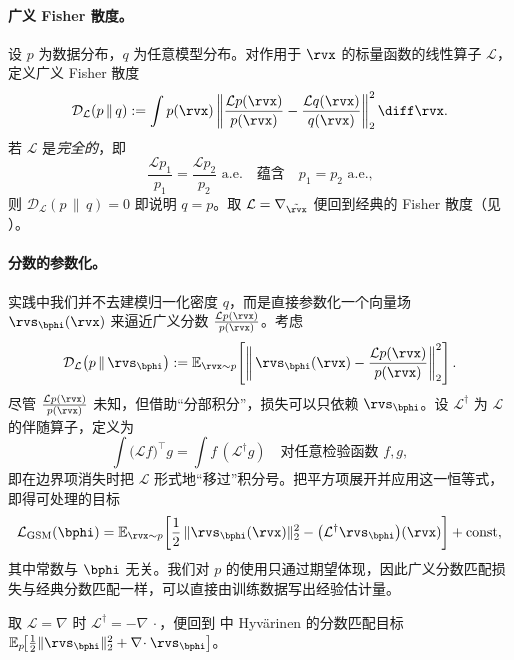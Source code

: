\paragraph{广义 Fisher 散度。}
设 $p$ 为数据分布，$q$ 为任意模型分布。对作用于 $\rvx$ 的标量函数的线性算子 $\mathcal L$，定义广义 Fisher 散度
\[
\mathcal D_{\mathcal L}(p \,\|\, q)
:= \int p(\rvx)
\left\|
\frac{\mathcal L p(\rvx)}{p(\rvx)}
-
\frac{\mathcal L q(\rvx)}{q(\rvx)}
\right\|_2^2 \diff \rvx.
\]
若 $\mathcal L$ 是\emph{完全的}，即
\[
\frac{\mathcal L p_1}{p_1}=\frac{\mathcal L p_2}{p_2} \text{ a.e.}\quad \text{蕴含}\quad p_1=p_2 \text{ a.e.,}
\]
则 $\mathcal D_{\mathcal L}(p \,\|\, q)=0$ 即说明 $q=p$。取 $\mathcal L=\nabla_{\tilde\rvx}$ 便回到经典的 Fisher 散度（见 ）。

\paragraph{分数的参数化。}
实践中我们并不去建模归一化密度 $q$，而是直接参数化一个向量场 $\rvs_\bphi(\rvx)$ 来逼近广义分数 $\frac{\mathcal L p(\rvx)}{p(\rvx)}$。考虑
\[
\mathcal D_{\mathcal L}\!\left(p \,\|\, \rvs_\bphi\right)
:= \mathbb E_{\rvx\sim p}\!\left[\left\|\,\rvs_\bphi(\rvx) - \frac{\mathcal L p(\rvx)}{p(\rvx)}\right\|_2^2\right].
\]
尽管 $\frac{\mathcal L p(\rvx)}{p(\rvx)}$ 未知，但借助“分部积分”，损失可以只依赖 $\rvs_\bphi$。设 $\mathcal L^\dagger$ 为 $\mathcal L$ 的伴随算子，定义为
\[
\int \big(\mathcal L f\big)^\top g
= \int f\,(\mathcal L^\dagger g)
\quad\text{对任意检验函数 } f,g,
\]
即在边界项消失时把 $\mathcal L$ 形式地“移过”积分号。把平方项展开并应用这一恒等式，即得可处理的目标
\[
\mathcal L_{\text{GSM}}(\bphi)
= \mathbb E_{\rvx\sim p}\!\left[
\frac{1}{2}\,\|\rvs_\bphi(\rvx)\|_2^2
-
\big(\mathcal L^\dagger \rvs_\bphi\big)(\rvx)
\right] + \text{const},
\]
其中常数与 $\bphi$ 无关。我们对 $p$ 的使用只通过期望体现，因此广义分数匹配损失与经典分数匹配一样，可以直接由训练数据写出经验估计量。

取 $\mathcal L=\nabla$ 时 $\mathcal L^\dagger=-\nabla\!\,\cdot$，便回到  中 Hyv\"arinen 的分数匹配目标 $\mathbb E_p\!\big[\tfrac{1}{2}\|\rvs_\bphi\|_2^2 + \nabla\!\cdot \rvs_\bphi\big]$。

